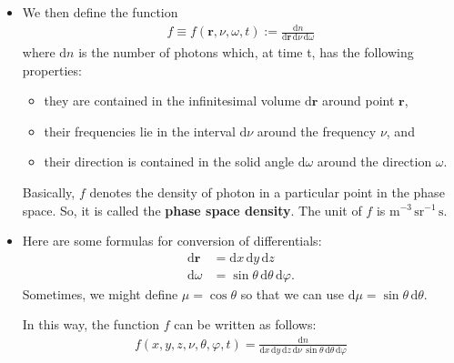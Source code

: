 \documentclass[10pt]{article}
\newcommand{\dee}{\mathrm{d}}
\newcommand{\ve}[1]{\mathbf{#1}}
\begin{document}
\begin{itemize}
    \item We then define the function
    \begin{align*}
      f \equiv f(\ve{r}, \nu, \omega, t) := \frac{\dee n }{\dee \ve{r}\, \dee \nu\, \dee\omega }
    \end{align*}
    where $\dee n$ is the number of photons which, at time t, has the following properties:
    \begin{itemize}
      \item they are contained in the infinitesimal volume $\dee \ve{r}$ around point $\ve{r}$,
      \item their frequencies lie in the interval $\dee \nu$ around the frequency $\nu$, and
      \item their direction is contained in the solid angle $\dee \omega$ around the direction $\omega$.
    \end{itemize}
    Basically, $f$ denotes the density of photon in a particular point in the phase space. So, it is called the \textbf{phase space density}. The unit of $f$ is $\mathrm{m}^{-3}\, \mathrm{sr}^{-1}\, \mathrm{s}.$

    \item Here are some formulas for conversion of differentials:
    \begin{align*}
      \dee \ve{r} &= \dee x\, \dee y\, \dee z \\
      \dee \omega &= \sin \theta\, \dee \theta\, \dee \varphi.
    \end{align*}
    Sometimes, we might define $\mu = \cos \theta$ so that we can use $\dee \mu = \sin \theta\, \dee \theta.$

    In this way, the function $f$ can be written as follows:
    \begin{align*}
      f(x,y,z,\nu,\theta,\varphi,t) = \frac{\dee n}{\dee x\, \dee y\, \dee z\, \dee \nu\, \sin \theta\, \dee \theta\, \dee \varphi}
    \end{align*}


\end{itemize}
\end{document}
